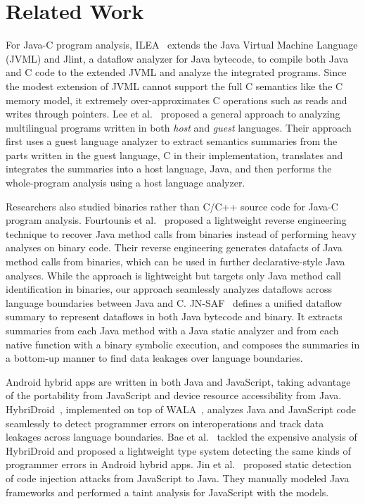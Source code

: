 \section{Related Work}\label{sec:related}
For Java-C program analysis, ILEA~\cite{ILEA} extends the Java Virtual Machine
Language (JVML) and Jlint, a dataflow analyzer for Java bytecode, to compile
both Java and C code to the extended JVML and analyze the integrated programs.
Since the modest extension of JVML cannot support the full C semantics like the
C memory model, it extremely over-approximates C operations such as reads and
writes through pointers.  Lee et al.~\cite{LeeASE20} proposed a general
approach to analyzing multilingual programs written in both {\it host} and {\it
guest} languages.  Their approach first uses a guest language analyzer to
extract semantics summaries from the parts written in the guest language, C in
their implementation, translates and integrates the summaries into a host
language, Java, and then performs the whole-program analysis using a host
language analyzer.

Researchers also studied binaries rather than C/C++ source code for Java-C
program analysis. Fourtounis et al.~\cite{scanning} proposed a lightweight
reverse engineering technique to recover Java method calls from binaries
instead of performing heavy analyses on binary code.  Their reverse engineering
generates datafacts of Java method calls from binaries, which can be used in
further declarative-style Java analyses. While the approach is lightweight but
targets only Java method call identification in binaries, our approach
seamlessly analyzes dataflows across language boundaries between Java and C.
JN-SAF~\cite{JN-SAF} defines a unified dataflow summary to represent dataflows
in both Java bytecode and binary.  It extracts summaries from each Java method
with a Java static analyzer and from each native function with a binary
symbolic execution, and composes the summaries in a bottom-up manner to find
data leakages over language boundaries.

Android hybrid apps are written in both Java and JavaScript, taking advantage
of the portability from JavaScript and device resource accessibility from Java.
HybriDroid~\cite{hybridroid}, implemented on top of WALA~\cite{WALA}, analyzes
Java and JavaScript code seamlessly to detect programmer errors on
interoperations and track data leakages across language boundaries.  Bae et
al.~\cite{BaeICSE19} tackled the expensive analysis of HybriDroid and proposed
a lightweight type system detecting the same kinds of programmer errors in
Android hybrid apps. Jin et al.~\cite{jin2014code} proposed static detection of
code injection attacks from JavaScript to Java.  They manually modeled Java
frameworks and performed a taint analysis for JavaScript with the models.

